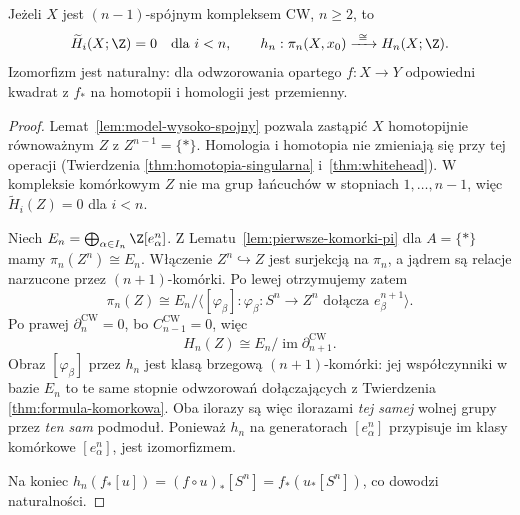 \begin{twierdzenie}
\label{thm:hurewicz-wyzszy}
Jeżeli $X$ jest
$(n-1)$-spójnym
kompleksem CW,
$n\geq2$, to
\[
 \widetilde H_i(X;\Z)=0
 \quad\text{dla }i<n,
 \qquad
 h_n:\pi_n(X,x_0)
 \xrightarrow{\ \cong\ }H_n(X;\Z).
\]
Izomorfizm jest naturalny:
dla odwzorowania opartego
$f:X\to Y$ odpowiedni
kwadrat z $f_*$ na
homotopii i homologii
jest przemienny.
\end{twierdzenie}
\begin{proof}
Lemat~\ref{lem:model-wysoko-spojny}
pozwala zastąpić
$X$ homotopijnie
równoważnym $Z$
z $Z^{n-1}=\{*\}$.
Homologia i homotopia
nie zmieniają się
przy tej operacji
(Twierdzenia
\ref{thm:homotopia-singularna}
i~\ref{thm:whitehead}).
W kompleksie komórkowym
$Z$ nie ma grup
łańcuchów w
stopniach $1,\ldots,n-1$,
więc
$\widetilde H_i(Z)=0$
dla $i<n$.

Niech
$E_n=\bigoplus_{\alpha\in I_n}
\Z[e_\alpha^n]$.
Z Lematu~\ref{lem:pierwsze-komorki-pi}
dla $A=\{*\}$ mamy
$\pi_n(Z^n)\cong E_n$.
Włączenie
$Z^n\hookrightarrow Z$
jest surjekcją
na $\pi_n$,
a jądrem są relacje
narzucone przez
$(n+1)$-komórki.
Po lewej otrzymujemy
zatem
\[
 \pi_n(Z)
 \cong
 E_n/\langle
   [\varphi_\beta]:
   \varphi_\beta:S^n\to Z^n
   \text{ dołącza }e_\beta^{n+1}
 \rangle.
\]
Po prawej
$\partial_n^{\mathrm{CW}}=0$,
bo $C_{n-1}^{\mathrm{CW}}=0$,
więc
\[
 H_n(Z)
 \cong E_n/
     \operatorname{im}
       \partial_{n+1}^{\mathrm{CW}}.
\]
Obraz $[\varphi_\beta]$
przez $h_n$ jest
klasą brzegową
$(n+1)$-komórki:
jej współczynniki
w bazie $E_n$
to te same stopnie
odwzorowań dołączających
z Twierdzenia
\ref{thm:formula-komorkowa}.
Oba ilorazy są
więc ilorazami
\emph{tej samej}
wolnej grupy przez
\emph{ten sam}
podmoduł.
Ponieważ $h_n$
na generatorach
$[e_\alpha^n]$
przypisuje im
klasy komórkowe
$[e_\alpha^n]$,
jest izomorfizmem.

Na koniec
$h_n(f_*[u])
=(f\circ u)_*[S^n]
=f_*(u_*[S^n])$,
co dowodzi
naturalności.
\end{proof}

